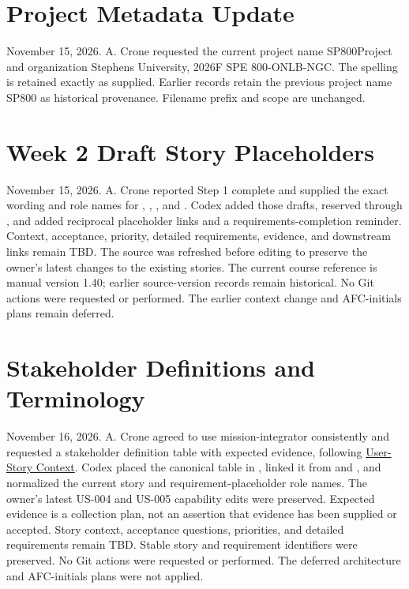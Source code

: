 \section{Project Metadata Update}
November 15, 2026. A. Crone requested the current project name SP800Project
and organization Stephens University, 2026F SPE 800-ONLB-NGC. The spelling
is retained exactly as supplied. Earlier records retain the previous project
name SP800 as historical provenance. Filename prefix and scope are unchanged.

\section{Week 2 Draft Story Placeholders}
November 15, 2026. A. Crone reported Step 1 complete and supplied the exact
wording and role names for , ,
, and . Codex added those drafts,
reserved  through , and
added reciprocal placeholder links and a requirements-completion reminder.
Context, acceptance, priority, detailed requirements, evidence, and downstream
links remain TBD. The source was refreshed before editing to preserve the
owner's latest changes to the existing stories. The current course reference
is manual version 1.40; earlier source-version records remain historical.
No Git actions were requested or performed. The earlier context change and
AFC-initials plans remain deferred.

\section{Stakeholder Definitions and Terminology}
November 16, 2026. A. Crone agreed to use mission-integrator consistently
and requested a stakeholder definition table with expected evidence, following
\hyperref[Section:AIUserStoryContext]{User-Story Context}. Codex placed the
canonical table in , linked it from
 and , and normalized the
current story and requirement-placeholder role names. The owner's latest
US-004 and US-005 capability edits were preserved. Expected evidence is a
collection plan, not an assertion that evidence has been supplied or accepted.
Story context, acceptance questions, priorities, and detailed requirements
remain TBD. Stable story and requirement identifiers were preserved.
No Git actions were requested or performed. The deferred architecture and
AFC-initials plans were not applied.

